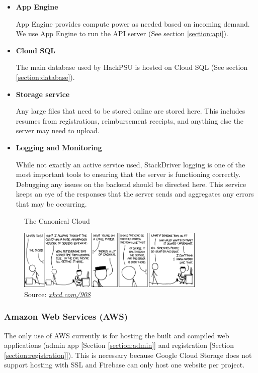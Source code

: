 \documentclass[twoside, 12pt]{article}
\newenvironment{tightitemize} %
{\begin{itemize}\itemsep1pt \parskip0pt \parsep0pt}
{\end{itemize}\vspace{-\topsep}}
\begin{document}
\begin{tightitemize}
    \begin{itemize}
        \item \textbf{App Engine}
        \par App Engine provides compute power as needed based on incoming demand. We use App Engine to run the API server (See section \ref{section:api}).
        \item \textbf{Cloud SQL}
        \par The main database used by HackPSU is hosted on Cloud SQL (See section \ref{section:database}).
        \item \textbf{Storage service}
        \par Any large files that need to be stored online are stored here. This includes resumes from registrations, reimbursement receipts, and anything else the server may need to upload.
        \item \textbf{Logging and Monitoring}
        \par While not exactly an active service used, StackDriver logging is one of the most important tools to ensuring that the server is functioning correctly. Debugging any issues on the backend should be directed here. This service keeps an eye of the responses that the server sends and aggregates any errors that may be occurring.
    \end{itemize}
    \begin{figure} [ht]
    \centering
    \caption{The Canonical Cloud}
    \includegraphics[width=0.8\textwidth]{the_cloud.png}
    \caption*{Source: \href{https://xkcd.com/908}{\textit{xkcd.com/908}} \cite{xkcd_success}}
    \label{fig:cloud}
    \end{figure}
\end{tightitemize}

\subsubsection{Amazon Web Services (AWS)}
\par The only use of AWS currently is for hosting the built and compiled web applications (admin app [Section \ref{section:admin}] and registration [Section \ref{section:registration}]). This is necessary because Google Cloud Storage does not support hosting with SSL and Firebase can only host one website per project.
\end{document}
